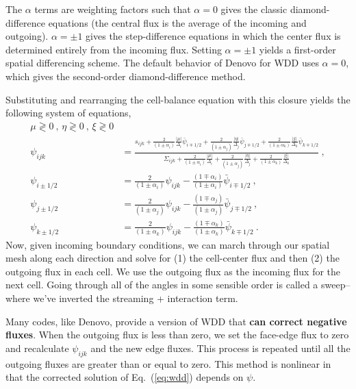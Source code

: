 \documentclass[12pt]{article}
\newcommand{\Di}{\ensuremath{\Delta_i}}
\newcommand{\Dj}{\ensuremath{\Delta_j}}
\newcommand{\Dk}{\ensuremath{\Delta_k}}
\begin{document}
The $\alpha$
terms are weighting factors such that $\alpha=0$ gives the classic
diamond-difference equations (the central flux is the average of the incoming and outgoing). $\alpha = \pm 1$ gives the step-difference
equations in which the center flux is determined entirely from the incoming flux.  Setting $\alpha = \pm 1$ yields a first-order spatial differencing
scheme.  The default behavior of Denovo for WDD uses $\alpha=0$, which gives
the second-order diamond-difference method.

Substituting and rearranging the cell-balance
equation with this closure yields the following system of equations,
\begin{equation}
  \begin{aligned} \mu\gtrless0\:,\,\eta\gtrless0\:,\,\xi\gtrless0\\
    \psi_{ijk} &= \frac{s_{ijk} +
      \frac{2}{(1\pm\alpha_i)}\frac{|\mu|}{\Di}\bar{\psi}_{i\mp1/2} +
      \frac{2}{(1\pm\alpha_j)}\frac{|\eta|}{\Dj}\bar{\psi}_{j\mp1/2} +
      \frac{2}{(1\pm\alpha_k)}\frac{|\xi|}{\Dk}\bar{\psi}_{k\mp1/2}}{
      \Sigma_{ijk} + \frac{2}{(1\pm\alpha_i)}\frac{|\mu|}{\Di} +
      \frac{2}{(1\pm\alpha_j)}\frac{|\eta|}{\Dj} +
      \frac{2}{(1\pm\alpha_k)}\frac{|\xi|}{\Dk} }\:,\\
    \psi_{i\pm1/2} &= \frac{2}{(1\pm\alpha_i)}\psi_{ijk}-
    \frac{(1\mp\alpha_i)}{(1\pm\alpha_i)}\bar{\psi}_{i\mp1/2}\:,\\
    \psi_{j\pm1/2} &= \frac{2}{(1\pm\alpha_j)}\psi_{ijk}-
    \frac{(1\mp\alpha_j)}{(1\pm\alpha_j)}\bar{\psi}_{j\mp1/2}\:,\\
    \psi_{k\pm1/2} &= \frac{2}{(1\pm\alpha_k)}\psi_{ijk}-
    \frac{(1\mp\alpha_k)}{(1\pm\alpha_k)}\bar{\psi}_{k\mp1/2}\:.
  \end{aligned}
  \label{eq:wdd}
\end{equation}
Now, given incoming boundary conditions, we can march through our spatial mesh along each direction and solve for (1) the cell-center flux and then (2) the outgoing flux in each cell. We use the outgoing flux as the incoming flux for the next cell. Going through all of the angles in some sensible order is called a sweep--where we've inverted the streaming + interaction term.

Many codes, like Denovo, provide a version of WDD that \textbf{can correct negative fluxes}.  When the outgoing flux is less than zero, we set the face-edge flux to zero and
recalculate $\psi_{ijk}$ and the new edge fluxes.  This process is repeated
until all the outgoing fluxes are greater than or equal to zero.  This method
is nonlinear in that the corrected solution of Eq.~(\ref{eq:wdd}) depends on
$\psi$.
\vspace*{-1 em}
\end{document}
